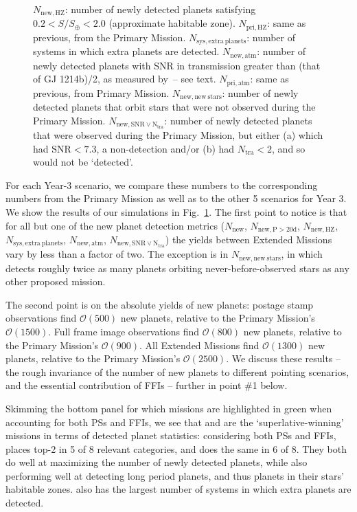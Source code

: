 \begin{figure}[!t]
{	$N_\mathrm{new,HZ}$: number of newly detected planets satisfying $0.2<S/S_\oplus<2.0$ (approximate habitable zone).
	$N_\mathrm{pri,HZ}$: same as previous, from the Primary Mission.
	$N_\mathrm{sys,extra\ planets}$: number of systems in which extra planets are detected.
	$N_\mathrm{new,atm}$: number of newly detected planets with SNR in transmission greater than (that of GJ 1214b)/2, as measured by \jwst\,-- see text.
	$N_\mathrm{pri,atm}$: same as previous, from Primary Mission.
	$N_\mathrm{new,new\ stars}$: number of newly detected planets that orbit stars that were not observed during the Primary Mission.
	$N_\mathrm{new,SNR\lor N_{tra}}$: number of newly detected planets that were observed during the Primary Mission, but either (a) which had $\mathrm{SNR}<7.3$, a non-detection and/or (b) had $N_\mathrm{tra}<2$, and so would not be `detected'.}
	\label{fig:yield_results}
\end{figure}

For each Year-3 scenario, we compare these numbers to the
corresponding numbers from the Primary Mission as well as to the other
5 scenarios for Year 3. We show the results of our simulations in
Fig.~\ref{fig:yield_results}.  The first point to notice is that for
all but one of the new planet detection metrics ($N_\mathrm{new}$,
$N_\mathrm{new,P>20d}$, $N_\mathrm{new,HZ}$,
$N_\mathrm{sys,extra\ planets}$, $N_\mathrm{new,atm}$,
$N_\mathrm{new,SNR\lor N_{tra}}$) the yields between Extended Missions
vary by less than a factor of two.  The exception is in
$N_\mathrm{new,new\ stars}$, in which \elong\:detects roughly twice as
many planets orbiting never-before-observed stars as any other
proposed mission.

The second point is on the absolute yields of new planets: postage stamp observations find $\mathcal{O}(500)$ new planets, relative to the Primary Mission's $\mathcal{O}(1500)$.
Full frame image observations find $\mathcal{O}(800)$ new planets, relative to the Primary Mission's $\mathcal{O}(900)$.
All Extended Missions find $\mathcal{O}(1300)$ new planets, relative to the Primary Mission's $\mathcal{O}(2500)$.
We discuss these results -- the rough invariance of the number of new planets to different pointing scenarios, and the essential contribution of FFIs -- further in point \#1 below.

Skimming the bottom panel for which missions are highlighted in green when accounting for both PSs and FFIs, we see that \npole\:and \hemis\:are the `superlative-winning' missions in terms of detected planet statistics: considering both PSs and FFIs, \npole\:places top-2 in 5 of 8 relevant categories, and \hemis\:does the same in 6 of 8.
They both do well at maximizing the number of newly detected planets, while also performing well at detecting long period planets, and thus planets in their stars' habitable zones.
\hemis\:also has the largest number of systems in which extra planets are detected.

